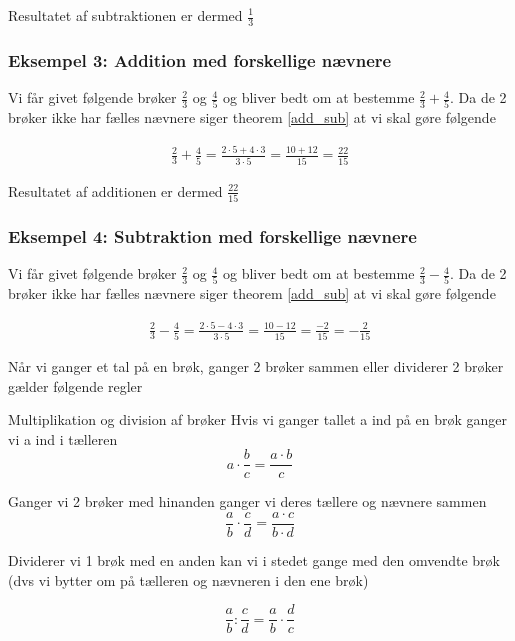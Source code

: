 Resultatet af subtraktionen er dermed $\frac{1}{3}$

\subsubsection*{Eksempel 3: Addition med forskellige nævnere}

Vi får givet følgende brøker $\frac{2}{3}$ og $\frac{4}{5}$ og bliver bedt om at bestemme $\frac{2}{3} + \frac{4}{5}$. Da de 2 brøker ikke har fælles nævnere siger theorem \ref{add_sub} at vi skal gøre følgende

\begin{align*}
\frac{2}{3} + \frac{4}{5} = \frac{2\cdot 5 + 4\cdot 3}{3\cdot 5} = \frac{10 + 12}{15} = \frac{22}{15}
\end{align*}

Resultatet af additionen er dermed $\frac{22}{15}$

\subsubsection*{Eksempel 4: Subtraktion med forskellige nævnere}

Vi får givet følgende brøker $\frac{2}{3}$ og $\frac{4}{5}$ og bliver bedt om at bestemme $\frac{2}{3} - \frac{4}{5}$. Da de 2 brøker ikke har fælles nævnere siger theorem \ref{add_sub} at vi skal gøre følgende

\begin{align*}
\frac{2}{3} - \frac{4}{5} = \frac{2\cdot 5 - 4\cdot 3}{3\cdot 5} = \frac{10 - 12}{15} = \frac{-2}{15} = -\frac{2}{15}
\end{align*}


Når vi ganger et tal på en brøk, ganger 2 brøker sammen eller dividerer 2 brøker gælder følgende regler

\begin{frm-thm}{Multiplikation og division af brøker}
Hvis vi ganger tallet a ind på en brøk ganger vi a ind i tælleren
\[a\cdot \frac{b}{c} = \frac{a\cdot b}{c}\]

Ganger vi 2 brøker med hinanden ganger vi deres tællere og nævnere sammen
\[\frac{a}{b} \cdot \frac{c}{d} = \frac{a\cdot c}{b\cdot d} \]

Dividerer vi 1 brøk med en anden kan vi i stedet gange med den omvendte brøk (dvs vi bytter om på tælleren og nævneren i den ene brøk)

\[\frac{a}{b} : \frac{c}{d} = \frac{a}{b} \cdot \frac{d}{c}\]
\end{frm-thm}

